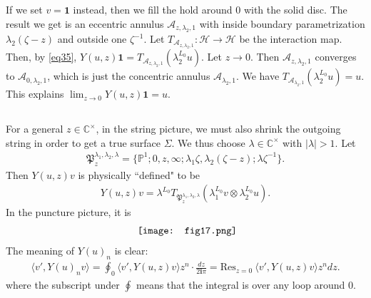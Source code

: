 \documentclass[11pt,b5paper,notitlepage]{article}
\theoremstyle{definition}
\theoremstyle{plain}
\newcommand{\fk}{\mathfrak}
\newcommand{\mc}{\mathcal}
\newcommand{\id}{\mathbf{1}}
\newcommand{\Res}{\mathrm{Res}}
\newcommand{\bk}[1]{\langle {#1}\rangle}
\newcommand{\im}{\mathbf{i}}
\newcommand{\Cbb}{\mathbb C}
\newcommand{\Pbb}{\mathbb P}
\numberwithin{equation}{section}
\begin{document}
If we set $v=\id$ instead, then we fill the hold around $0$ with the solid disc. The result we get is an eccentric annulus $\mc A_{z,\lambda_2,1}$ with inside boundary parametrization $\lambda_2(\zeta-z)$ and outside one $\zeta^{-1}$. Let $T_{\mc A_{z,\lambda_2,1}}:\mc H\rightarrow\mc H$ be the interaction map. Then, by \eqref{eq35}, $Y(u,z)\id=T_{\mc A_{z,\lambda_2,1}}(\lambda_2^{L_0}u)$. Let $z\rightarrow 0$. Then $\mc A_{z,\lambda_2,1}$ converges to $\mc A_{0,\lambda_2,1}$, which is just the concentric annulus $\mc A_{\lambda_2,1}$. We have $T_{\mc A_{\lambda_2,1}}(\lambda_2^{L_0}u)=u$. This explains $\lim_{z\rightarrow 0} Y(u,z)\id=u$.











\subsection{}


For a general $z\in\Cbb^\times$, in the string picture, we must also shrink the outgoing string in order to get a true surface $\Sigma$. We thus choose $\lambda\in\Cbb^\times$ with $|\lambda|>1$. Let
\begin{align*}
\fk P_z^{\lambda_1,\lambda_2,\lambda}=\{\Pbb^1;0,z,\infty;\lambda_1\zeta,\lambda_2(\zeta-z);\lambda\zeta^{-1}\}.	
\end{align*}
Then $Y(u,z)v$ is physically ``defined" to be
\begin{align}
Y(u,z)v=\lambda^{L_0}T_{\fk P_z^{\lambda_1,\lambda_2,\lambda}}(\lambda_1^{L_0}v\otimes\lambda_2^{L_0}u).	
\end{align}
In the puncture picture, it is
\begin{align*}
	\vcenter{\hbox{{
				\texttt{[image: fig17.png]}}}}	
\end{align*}
The meaning of $Y(u)_n$ is clear:
\begin{align*}
\bk{v',Y(u)_n v}=\oint_0 \bk{v',Y(u,z)v} z^n\cdot\frac{dz}{2\im\pi}=\Res_{z=0}~	\bk{v',Y(u,z)v} z^ndz.
\end{align*}
where the subscript under $\oint$ means that the integral is over any loop around $0$.

\subsection{}
\end{document}
